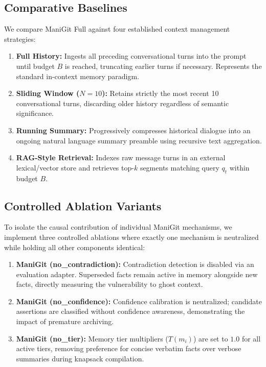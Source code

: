 \subsection{Comparative Baselines}
We compare ManiGit Full against four established context management strategies:
\begin{enumerate}
    \item \textbf{Full History:} Ingests all preceding conversational turns into the prompt until budget $B$ is reached, truncating earlier turns if necessary. Represents the standard in-context memory paradigm.
    \item \textbf{Sliding Window ($N=10$):} Retains strictly the most recent 10 conversational turns, discarding older history regardless of semantic significance.
    \item \textbf{Running Summary:} Progressively compresses historical dialogue into an ongoing natural language summary preamble using recursive text aggregation.
    \item \textbf{RAG-Style Retrieval:} Indexes raw message turns in an external lexical/vector store and retrieves top-$k$ segments matching query $q_t$ within budget $B$.
\end{enumerate}

\subsection{Controlled Ablation Variants}
To isolate the causal contribution of individual ManiGit mechanisms, we implement three controlled ablations where exactly one mechanism is neutralized while holding all other components identical:
\begin{enumerate}
    \item \textbf{ManiGit (no\_contradiction):} Contradiction detection is disabled via an evaluation adapter. Superseded facts remain active in memory alongside new facts, directly measuring the vulnerability to ghost context.
    \item \textbf{ManiGit (no\_confidence):} Confidence calibration is neutralized; candidate assertions are classified without confidence awareness, demonstrating the impact of premature archiving.
    \item \textbf{ManiGit (no\_tier):} Memory tier multipliers ($T(m_i)$) are set to $1.0$ for all active tiers, removing preference for concise verbatim facts over verbose summaries during knapsack compilation.
\end{enumerate}

